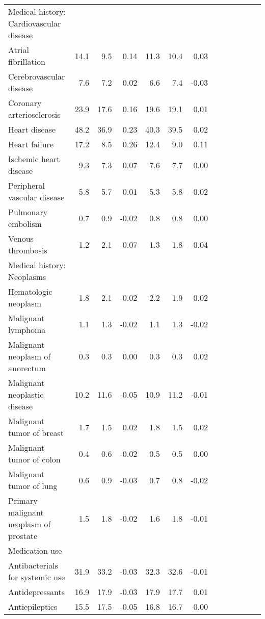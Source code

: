 \documentclass[11pt,]{article}
\begin{document}
\begin{longtable}{lrrrrrrrrrrrr}
  Medical history: Cardiovascular disease &    &    &     &    &    &     \\ 
      Atrial fibrillation & 14.1 &  9.5 &  0.14 & 11.3 & 10.4 &  0.03 \\ 
      Cerebrovascular disease &  7.6 &  7.2 &  0.02 &  6.6 &  7.4 & -0.03 \\ 
      Coronary arteriosclerosis & 23.9 & 17.6 &  0.16 & 19.6 & 19.1 &  0.01 \\ 
      Heart disease & 48.2 & 36.9 &  0.23 & 40.3 & 39.5 &  0.02 \\ 
      Heart failure & 17.2 &  8.5 &  0.26 & 12.4 &  9.0 &  0.11 \\ 
      Ischemic heart disease &  9.3 &  7.3 &  0.07 &  7.6 &  7.7 &  0.00 \\ 
      Peripheral vascular disease &  5.8 &  5.7 &  0.01 &  5.3 &  5.8 & -0.02 \\ 
      Pulmonary embolism &  0.7 &  0.9 & -0.02 &  0.8 &  0.8 &  0.00 \\ 
      Venous thrombosis &  1.2 &  2.1 & -0.07 &  1.3 &  1.8 & -0.04 \\ 
  Medical history: Neoplasms &    &    &     &    &    &     \\ 
      Hematologic neoplasm &  1.8 &  2.1 & -0.02 &  2.2 &  1.9 &  0.02 \\ 
      Malignant lymphoma &  1.1 &  1.3 & -0.02 &  1.1 &  1.3 & -0.02 \\ 
      Malignant neoplasm of anorectum &  0.3 &  0.3 &  0.00 &  0.3 &  0.3 &  0.02 \\ 
      Malignant neoplastic disease & 10.2 & 11.6 & -0.05 & 10.9 & 11.2 & -0.01 \\ 
      Malignant tumor of breast &  1.7 &  1.5 &  0.02 &  1.8 &  1.5 &  0.02 \\ 
      Malignant tumor of colon &  0.4 &  0.6 & -0.02 &  0.5 &  0.5 &  0.00 \\ 
      Malignant tumor of lung &  0.6 &  0.9 & -0.03 &  0.7 &  0.8 & -0.02 \\ 
      Primary malignant neoplasm of prostate &  1.5 &  1.8 & -0.02 &  1.6 &  1.8 & -0.01 \\ 
  Medication use &    &    &     &    &    &     \\ 
      Antibacterials for systemic use & 31.9 & 33.2 & -0.03 & 32.3 & 32.6 & -0.01 \\ 
      Antidepressants & 16.9 & 17.9 & -0.03 & 17.9 & 17.7 &  0.01 \\ 
      Antiepileptics & 15.5 & 17.5 & -0.05 & 16.8 & 16.7 &  0.00 \\ 

\end{longtable}
\end{document}
